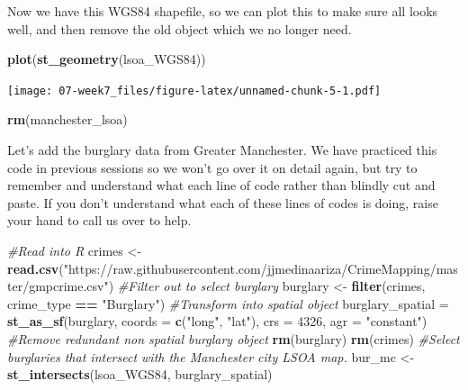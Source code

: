 \documentclass[]{book}
\newenvironment{Shaded}{\begin{snugshade}}{\end{snugshade}}
\newcommand{\CommentTok}[1]{\textcolor[rgb]{0.56,0.35,0.01}{\textit{#1}}}
\newcommand{\DataTypeTok}[1]{\textcolor[rgb]{0.13,0.29,0.53}{#1}}
\newcommand{\DecValTok}[1]{\textcolor[rgb]{0.00,0.00,0.81}{#1}}
\newcommand{\KeywordTok}[1]{\textcolor[rgb]{0.13,0.29,0.53}{\textbf{#1}}}
\newcommand{\NormalTok}[1]{#1}
\newcommand{\OperatorTok}[1]{\textcolor[rgb]{0.81,0.36,0.00}{\textbf{#1}}}
\newcommand{\StringTok}[1]{\textcolor[rgb]{0.31,0.60,0.02}{#1}}
\begin{document}
Now we have this WGS84 shapefile, so we can plot this to make sure all looks well, and then remove the old object which we no longer need.

\begin{Shaded}
\begin{Highlighting}[]
\KeywordTok{plot}\NormalTok{(}\KeywordTok{st_geometry}\NormalTok{(lsoa_WGS84))}
\end{Highlighting}
\end{Shaded}

\texttt{[image: 07-week7\_files/figure-latex/unnamed-chunk-5-1.pdf]}

\begin{Shaded}
\begin{Highlighting}[]
\KeywordTok{rm}\NormalTok{(manchester_lsoa)}
\end{Highlighting}
\end{Shaded}

Let's add the burglary data from Greater Manchester. We have practiced this code in previous sessions so we won't go over it on detail again, but try to remember and understand what each line of code rather than blindly cut and paste. If you don't understand what each of these lines of codes is doing, raise your hand to call us over to help.

\begin{Shaded}
\begin{Highlighting}[]
\CommentTok{#Read into R}
\NormalTok{crimes <-}\StringTok{ }\KeywordTok{read.csv}\NormalTok{(}\StringTok{"https://raw.githubusercontent.com/jjmedinaariza/CrimeMapping/master/gmpcrime.csv"}\NormalTok{)}
\CommentTok{#Filter out to select burglary}
\NormalTok{burglary <-}\StringTok{ }\KeywordTok{filter}\NormalTok{(crimes, crime_type }\OperatorTok{==}\StringTok{ "Burglary"}\NormalTok{)}
\CommentTok{#Transform into spatial object}
\NormalTok{burglary_spatial =}\StringTok{ }\KeywordTok{st_as_sf}\NormalTok{(burglary, }\DataTypeTok{coords =} \KeywordTok{c}\NormalTok{(}\StringTok{"long"}\NormalTok{, }\StringTok{"lat"}\NormalTok{), }
                 \DataTypeTok{crs =} \DecValTok{4326}\NormalTok{, }\DataTypeTok{agr =} \StringTok{"constant"}\NormalTok{)}
\CommentTok{#Remove redundant non spatial burglary object}
\KeywordTok{rm}\NormalTok{(burglary)}
\KeywordTok{rm}\NormalTok{(crimes)}
\CommentTok{#Select burglaries that intersect with the Manchester city LSOA map.}
\NormalTok{bur_mc <-}\StringTok{ }\KeywordTok{st_intersects}\NormalTok{(lsoa_WGS84, burglary_spatial)}
\end{Highlighting}
\end{Shaded}
\end{document}
